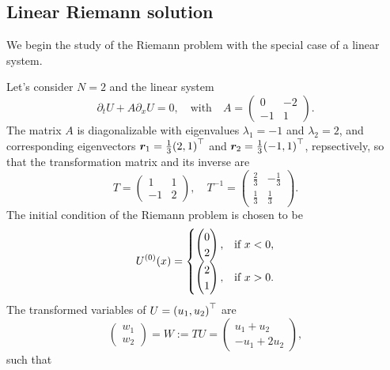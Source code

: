 \subsection{Linear Riemann solution}

We begin the study of the Riemann problem with the special case of a linear system.

\begin{example}
	Let's consider \(N = 2\) and the linear system
	\[
		\partial_t U + A\partial_x U = 0, \quad \text{with} \quad A = \begin{pmatrix}
			0 & -2\\
			-1 & 1
		\end{pmatrix}.
	\]
	The matrix \(A\) is diagonalizable with eigenvalues \(\lambda_1 = -1\) and \(\lambda_2 = 2\), and corresponding eigenvectors \(\bm{r}_1 = \frac{1}{3}\parentheses*{2, 1}^\top\) and \(\bm{r}_2 = \frac{1}{3}\parentheses*{-1, 1}^\top\), repsectively, so that the transformation matrix and its inverse are
	\[
		T = \begin{pmatrix}
			1 & 1\\
			-1 & 2
		\end{pmatrix}, \quad T^{-1} = \begin{pmatrix}
			\frac{2}{3} & -\frac{1}{3}\\
			\frac{1}{3} & \frac{1}{3}
		\end{pmatrix}.
	\]
	The initial condition of the Riemann problem is chosen to be
	\[
		U^{\parentheses*{0}}\parentheses*{x} = \begin{cases}
			\begin{pmatrix}
				0\\
				2
			\end{pmatrix}, & \text{if }x < 0,\\
			\begin{pmatrix}
				2\\
				1
			\end{pmatrix}, & \text{if }x > 0.
		\end{cases}
	\]
	The transformed variables of \(U = \parentheses*{u_1, u_2}^\top\) are
	\[
		\begin{pmatrix}
			w_1\\
			w_2
		\end{pmatrix} = W := TU = \begin{pmatrix}
			u_1 + u_2\\
			-u_1 + 2u_2
		\end{pmatrix},
	\]
	such that
	\begin{align*}

\end{align*}
\end{example}
